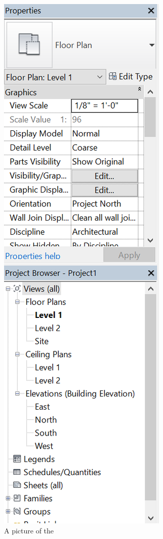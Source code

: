 \documentclass{tufte-book} %
\begin{document}
\begin{figure}
\begin{marginfigure}
	\includegraphics[width=\linewidth]{revitsidebar}
	\caption[The revit side bar]{A picture of the }
	\label{fig:revsidebar}
\end{marginfigure}


\end{figure}
\end{document}

